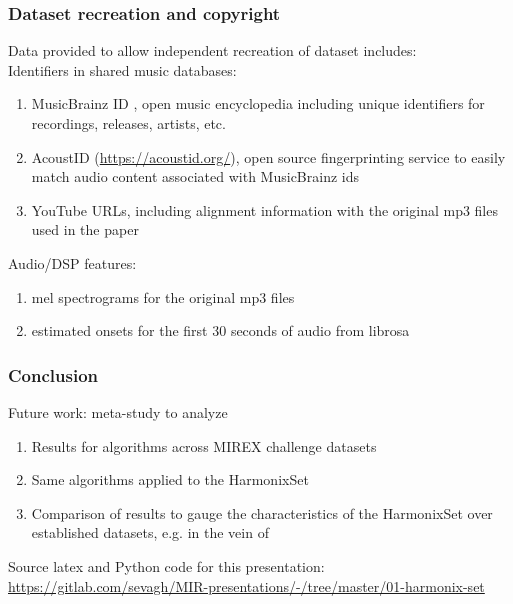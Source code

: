 \documentclass{beamer}
\begin{document}
\begin{frame}
	\frametitle{Dataset recreation and copyright}
	Data provided to allow independent recreation of dataset includes:\\
	Identifiers in shared music databases:
	\begin{enumerate}
		\item
			MusicBrainz ID , open music encyclopedia including unique identifiers for recordings, releases, artists, etc.
		\item
			AcoustID (\href{https://acoustid.org/}{https://acoustid.org/}), open source fingerprinting service to easily match audio content associated with MusicBrainz ids
		\item
			YouTube URLs, including alignment information with the original mp3 files used in the paper
	\end{enumerate}
	Audio/DSP features:
	\begin{enumerate}
		\item
			mel spectrograms for the original mp3 files
		\item
			estimated onsets for the first 30 seconds of audio from librosa
	\end{enumerate}
\end{frame}


\begin{frame}
	\frametitle{Conclusion}
	\vspace{1em}
	Future work: meta-study to analyze
	\begin{enumerate}
		\item
			Results for algorithms across MIREX challenge datasets
		\item
			Same algorithms applied to the HarmonixSet
		\item
			Comparison of results to gauge the characteristics of the HarmonixSet over established datasets, e.g. in the vein of \cite{mazurkahard}
	\end{enumerate}
	\vspace{1em}
	Source latex and Python code for this presentation: \href{https://gitlab.com/sevagh/MIR-presentations/-/tree/master/01-harmonix-set}{https://gitlab.com/sevagh/MIR-presentations/-/tree/master/01-harmonix-set}
\end{frame}
\end{document}
